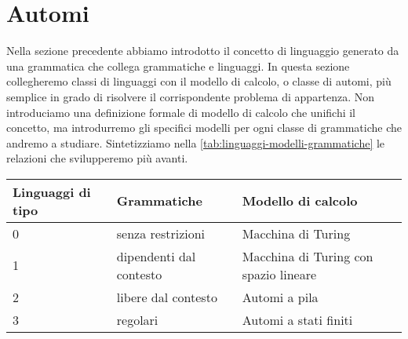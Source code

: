 \section{Automi}\label{sec:automi}

Nella sezione precedente abbiamo introdotto il concetto di linguaggio generato da una grammatica che collega grammatiche
e linguaggi.
In questa sezione collegheremo classi di linguaggi con il modello di calcolo, o classe di automi, più semplice in grado di
risolvere il corrispondente problema di appartenza.
Non introduciamo una definizione formale di modello di calcolo che unifichi il concetto, ma introdurremo gli specifici
modelli per ogni classe di grammatiche che andremo a studiare.
Sintetizziamo nella \cref{tab:linguaggi-modelli-grammatiche} le relazioni che svilupperemo più avanti.


\begin{table*}[h!]\label{tab:linguaggi-modelli-grammatiche}
	\caption{Grammatiche, linguaggi e modelli di calcolo}
	\begin{tabular}{p{2.8cm} p{4.0cm} p{7.0cm}}
		\toprule
		Linguaggi di tipo   & Grammatiche   & Modello di calcolo \\
		\midrule
		0   & senza restrizioni       & Macchina di Turing        \\
		1     & dipendenti dal contesto     & Macchina di Turing con spazio lineare  \\
		2   & libere dal contesto     & Automi a pila      \\
		3   & regolari     & Automi a stati finiti      \\
		\bottomrule
	\end{tabular}
\end{table*}

